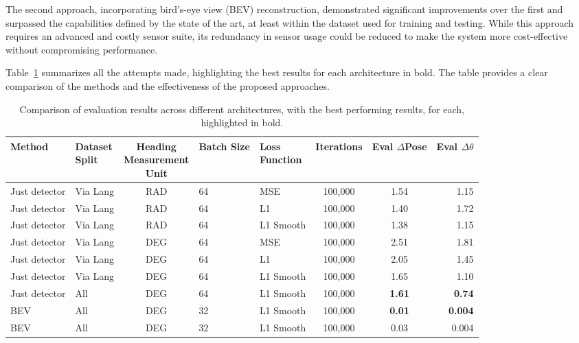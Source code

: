 The second approach, incorporating bird’s-eye view (BEV) reconstruction, demonstrated significant improvements over the first and surpassed the capabilities defined by the state of the art, at least within the dataset used for training and testing. While this approach requires an advanced and costly sensor suite, its redundancy in sensor usage could be reduced to make the system more cost-effective without compromising performance.

Table~\ref{tab:evaluation_results_2} summarizes all the attempts made, highlighting the best results for each architecture in bold. The table provides a clear comparison of the methods and the effectiveness of the proposed approaches.

\begin{table}[H]
\centering
\caption{Comparison of evaluation results across different architectures, with the best performing results, for each, highlighted in bold.}
\label{tab:evaluation_results_2}
\scriptsize 
\renewcommand{\arraystretch}{1} 
\begin{tabular}{llcllccr}
\toprule
\textbf{Method} & \makecell{\textbf{Dataset}\\\textbf{Split}} & \makecell{\textbf{Heading}\\\textbf{Measurement}\\\textbf{Unit}} & \textbf{Batch Size} & \makecell{\textbf{Loss}\\\textbf{Function}} & \textbf{Iterations} & \makecell{\textbf{Eval}\\$\Delta$\textbf{Pose}} & \makecell{\textbf{Eval}\\$\Delta \theta$} \\
\midrule
Just detector & Via Lang & RAD & 64 & MSE        & 100,000 & 1.54 & 1.15 \\
Just detector & Via Lang & RAD & 64 & L1         & 100,000 & 1.40 & 1.72 \\
Just detector & Via Lang & RAD & 64 & L1 Smooth  & 100,000 & 1.38 & 1.15 \\
Just detector & Via Lang & DEG & 64 & MSE        & 100,000 & 2.51 & 1.81 \\
Just detector & Via Lang & DEG & 64 & L1         & 100,000 & 2.05 & 1.45 \\
Just detector & Via Lang & DEG & 64 & L1 Smooth  & 100,000 & 1.65 & 1.10 \\
Just detector & All      & DEG & 64 & L1 Smooth  & 100,000 & \textbf{1.61} & \textbf{0.74} \\
BEV           & All      & DEG & 32 & L1 Smooth  & 100,000 & \textbf{0.01} & \textbf{0.004} \\
BEV           & All      & DEG & 32 & L1 Smooth  & 100,000 & 0.03 & 0.004 \\
\bottomrule
\end{tabular}
\end{table}

